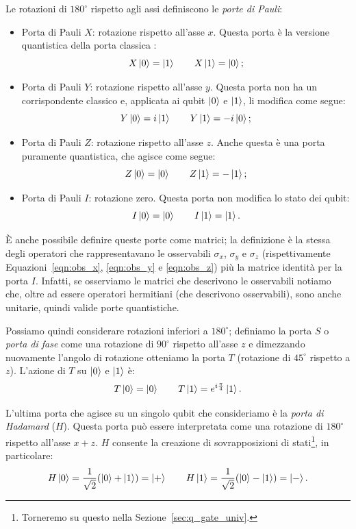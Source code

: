 Le rotazioni di $180^\circ$ rispetto agli assi definiscono le \emph{porte di Pauli}:
\begin{itemize}
	\item Porta di Pauli $X$: rotazione rispetto all'asse $x$. Questa porta è la versione quantistica della porta classica :
	\[
	X\Ket{0} = \Ket{1} \qquad  X\Ket{1} = \Ket{0};
	\]
	\item Porta di Pauli $Y$: rotazione rispetto all'asse $y$. Questa porta non ha un corrispondente classico e, applicata ai qubit $\Ket{0}$ e $\Ket{1}$, li modifica come segue:
	\[
	Y\Ket{0} = i\Ket{1} \qquad  Y\Ket{1} = -i\Ket{0};
	\]
	\item Porta di Pauli $Z$: rotazione rispetto all'asse $z$. Anche questa è una porta puramente quantistica, che agisce come segue:
	\[
	Z\Ket{0} = \Ket{0} \qquad  Z\Ket{1} = -\Ket{1};
	\]
	\item Porta di Pauli $I$: rotazione zero. Questa porta non modifica lo stato dei qubit:
	\[
	I\Ket{0} = \Ket{0} \qquad  I\Ket{1} = \Ket{1}.
	\]
\end{itemize}
È anche possibile definire queste porte come matrici; la definizione è la stessa degli operatori che rappresentavano le osservabili $\sigma_x$, $\sigma_y$ e $\sigma_z$ (rispettivamente Equazioni~\ref{eqn:obs_x}, \ref{eqn:obs_y} e \ref{eqn:obs_z}) più la matrice identità per la porta $I$. Infatti, se osserviamo le matrici che descrivono le osservabili notiamo che, oltre ad essere operatori hermitiani (che descrivono osservabili), sono anche unitarie, quindi valide porte quantistiche.

Possiamo quindi considerare rotazioni inferiori a $180^\circ$; definiamo la porta $S$ o \emph{porta di fase} come una rotazione di $90^\circ$ rispetto all'asse $z$ e dimezzando nuovamente l'angolo di rotazione otteniamo la porta $T$ (rotazione di $45^\circ$ rispetto a $z$). L'azione di $T$ su $\Ket{0}$ e $\Ket{1}$ è:
\[
T\Ket{0} = \Ket{0} \qquad  T\Ket{1} = e^{i\frac{\pi}{4}}\Ket{1}.
\]

L'ultima porta che agisce su un singolo qubit che consideriamo è la \emph{porta di Hadamard} ($H$). Questa porta può essere interpretata come una rotazione di $180^\circ$ rispetto all'asse $x+z$. $H$ consente la creazione di sovrapposizioni di stati\footnote{Torneremo su questo nella Sezione~\ref{sec:q_gate_univ}.}, in particolare:
\[
H\Ket{0} = \frac{1}{\sqrt{2}} (\Ket{0} + \Ket{1}) = \Ket{+} \qquad  H\Ket{1} = \frac{1}{\sqrt{2}} (\Ket{0} - \Ket{1}) = \Ket{-}.
\]


